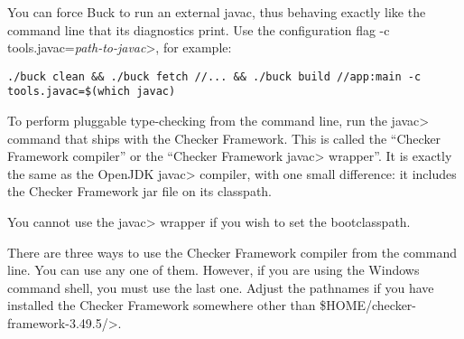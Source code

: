 You can force Buck to run an external javac, thus behaving exactly like the
command line that its diagnostics print.  Use the configuration flag \<-c
tools.javac=\emph{path-to-javac}>, for example:

\begin{Verbatim}
./buck clean && ./buck fetch //... && ./buck build //app:main -c tools.javac=$(which javac)
\end{Verbatim}


\label{javac-installation}      %

To perform pluggable type-checking from the command line, run the \<javac>
command that ships with the Checker Framework.  This is called the
``Checker Framework compiler'' or the ``Checker Framework \<javac> wrapper''.
It is exactly the same as the OpenJDK
\<javac> compiler, with one small difference:  it includes the Checker
Framework jar file on its classpath.

You cannot use the \<javac> wrapper if you wish to set the bootclasspath.

There are three ways to use the Checker Framework compiler from the command
line.  You can use any
one of them.  However, if you are using the Windows command shell, you must
use the last one.
Adjust the pathnames if you have installed the Checker Framework somewhere
other than \<\${HOME}/checker-framework-3.49.5/>.


